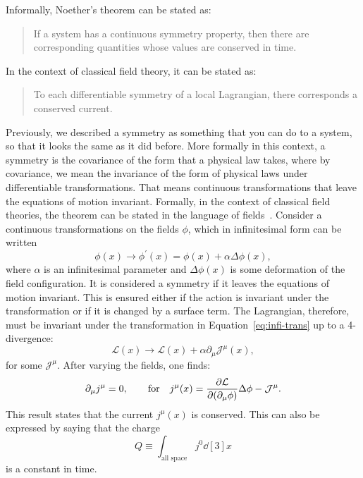 Informally, Noether's theorem can be stated as:
\begin{quote}
If a system has a continuous symmetry property, then there are corresponding quantities whose values are conserved in time.
\end{quote}
In the context of classical field theory, it can be stated as:
\begin{quote}
To each differentiable symmetry of a local Lagrangian, there corresponds a conserved current.
\end{quote}
Previously, we described a symmetry as something that you can do to a system, so that it looks the same as it did before. More formally in this context, a symmetry is the covariance of the form that a physical law takes, where by covariance, we mean the invariance of the form of physical laws under differentiable transformations. That means continuous transformations that leave the equations of motion invariant. Formally, in the context of classical field theories, the theorem can be stated in the language of fields~\cite{Peskin2019-bt}. Consider a continuous transformations on the fields $\phi$, which in infinitesimal form can be written
\begin{equation}
\phi(x)\rightarrow\phi^\prime(x)=\phi(x)+\alpha\Delta\phi(x),
\label{eq:infi-trans}
\end{equation}  
where $\alpha$ is an infinitesimal parameter and $\Delta\phi(x)$ is some deformation of the field configuration. It is considered a symmetry if it leaves the equations of motion invariant. This is ensured either if the action is invariant under the transformation or if it is changed by a surface term. The Lagrangian, therefore, must be invariant under  the transformation in Equation~\ref{eq:infi-trans} up to a 4-divergence:
\begin{equation}
\mathcal{L}(x)\rightarrow\mathcal{L}(x)+\alpha\partial_{\mu}\mathcal{J}^{\mu}(x),
\end{equation}
for some $\mathcal{J}^{\mu}$. After varying the fields, one finds:
\begin{equation}
\partial_{\mu}j^{\mu}=0,\qquad \textrm{for} \quad j^{\mu}(x)=\pdv{\mathcal{L}}{\qty(\partial_{\mu}\phi)}\Delta\phi-\mathcal{J}^{\mu}.
\end{equation}
This result states that the current $j^{\mu}(x)$ is conserved. This can also be expressed by saying that the charge
\begin{equation}
Q\equiv\int_{\textrm{all space}}j^0\dd[3]{x}
\end{equation}
is a constant in time.


